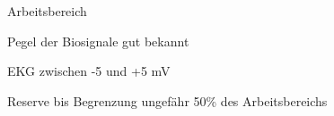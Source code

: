 \documentclass[a4paper]{article}
\begin{document}
\begin{multicols}{3}

  Arbeitsbereich
  \begin{itemize*}
    \item Pegel der Biosignale gut bekannt
    \item EKG zwischen -5 und +5 mV
    \item Reserve bis Begrenzung ungefähr 50\% des Arbeitsbereichs
  \end{itemize*}


\end{multicols}
\end{document}
